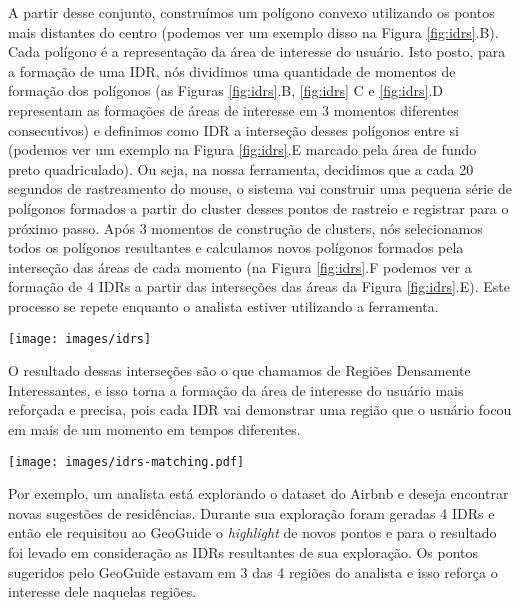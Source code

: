 A partir desse conjunto, construímos um polígono convexo utilizando os pontos mais distantes do centro (podemos ver um exemplo disso na Figura \ref{fig:idrs}.B). Cada polígono é a representação da área de interesse do usuário. Isto posto, para a formação de uma IDR, nós dividimos uma quantidade de momentos de formação dos polígonos (as Figuras \ref{fig:idrs}.B, \ref{fig:idrs} C e \ref{fig:idrs}.D representam as formações de áreas de interesse em 3 momentos diferentes consecutivos) e definimos como IDR a interseção desses polígonos entre si (podemos ver um exemplo na Figura \ref{fig:idrs}.E marcado pela área de fundo preto quadriculado). Ou seja, na nossa ferramenta, decidimos que a cada 20 segundos de rastreamento do mouse, o sistema vai construir uma pequena série de polígonos formados a partir do cluster desses pontos de rastreio e registrar para o próximo passo. Após 3 momentos de construção de clusters, nós selecionamos todos os polígonos resultantes e calculamos novos polígonos formados pela interseção das áreas de cada momento (na Figura \ref{fig:idrs}.F podemos ver a formação de 4 IDRs a partir das interseções das áreas da Figura \ref{fig:idrs}.E). Este processo se repete enquanto o analista estiver utilizando a ferramenta.

\begin{figure*}[t]
	\centering
	\texttt{[image: images/idrs]}
	\caption{Imagem do processo de construção de IDRs}
	\label{fig:idrs-geoguide}
	\vspace{-10pt}
\end{figure*}

O resultado dessas interseções são o que chamamos de Regiões Densamente Interessantes, e isso torna a formação da área de interesse do usuário mais reforçada e precisa, pois cada IDR vai demonstrar uma região que o usuário focou em mais de um momento em tempos diferentes.

\begin{figure*}[t]
	\centering
	\texttt{[image: images/idrs-matching.pdf]}
	\caption{Imagem das sugestões do GeoGuide relacionadas com as IDRs do analista}
	\label{fig:idrs}
	\vspace{-10pt}
\end{figure*}

Por exemplo, um analista está explorando o dataset do Airbnb e deseja encontrar novas sugestões de residências. Durante sua exploração foram geradas 4 IDRs e então ele requisitou ao GeoGuide o \textit{highlight} de novos pontos e para o resultado foi levado em consideração as IDRs resultantes de sua exploração. Os pontos sugeridos pelo GeoGuide estavam em 3 das 4 regiões do analista e isso reforça o interesse dele naquelas regiões.

